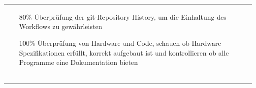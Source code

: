 \begin{scriptsize}
\begin{center}
\begin{tabularx}{\textwidth}{|p{2.2cm}|X|}
{\begin{minipage}{.78\textwidth}
\begin{flushleft}
\begin{itemize}[leftmargin=7mm]
        \item[80\%] Überprüfung der \gls{git}-Repository History, um die Einhaltung des Workflows zu gewährleisten
        \item[100\%] Überprüfung von Hardware und Code, schauen ob Hardware Spezifikationen erfüllt, korrekt aufgebaut ist und kontrollieren ob alle Programme eine Dokumentation bieten
    \end{itemize}
    \end{flushleft}
    \end{minipage}} \\
    & & & \\
    & & & \\
    & & & \\
    
    \hline
\end{tabularx}
\end{center}
\endgroup
\end{scriptsize}
\newpage

